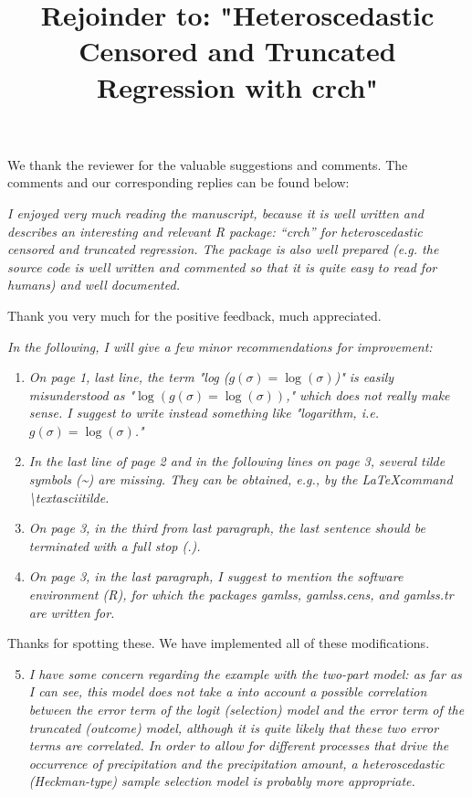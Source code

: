 \documentclass[12pt,a4paper]{article}
\begin{document}
\title{Rejoinder to: "Heteroscedastic Censored and Truncated Regression with crch"}
\maketitle

We thank the reviewer for the valuable suggestions and comments. The comments
and our corresponding replies can be found below:

\textit{I enjoyed very much reading the manuscript, because it is well written
and describes an interesting and relevant R package: ``crch'' for
heteroscedastic censored and truncated regression. The package is also well
prepared (e.g. the source code is well written and commented so that it is
quite easy to read for humans) and well documented.}

Thank you very much for the positive feedback, much appreciated.

\medskip

\textit{In the following, I will give a few minor recommendations for improvement:}
\begin{enumerate}
  \item \textit{On page 1, last line, the term "log ($g(\sigma) =
  \log(\sigma)$)" is easily misunderstood as "$\log(g(\sigma) =
  \log(\sigma))$," which does not really make sense.  I suggest to write
  instead something like "logarithm, i.e. $g(\sigma) = \log(\sigma)$."} 
  \item \textit{In the last line of page 2 and in the following lines on page
  3, several tilde symbols (\textasciitilde) are missing. They can be obtained,
  e.g., by the \LaTeX command \textbackslash textasciitilde.} 
  \item \textit{On
  page 3, in the third from last paragraph, the last sentence should be
  terminated with a full stop (.).} 
  \item \textit{On page 3, in the last paragraph, I suggest to mention the
  software environment (R), for which the packages gamlss, gamlss.cens, and
  gamlss.tr are written for.}
\end{enumerate}

Thanks for spotting these. We have implemented all of these modifications.

\medskip

\begin{enumerate}
  \setcounter{enumi}{4}
  \item \textit{I have some concern regarding the example with the two-part
  model: as far as I can see, this model does not take a into account a
  possible correlation between the error term of the logit (selection) model
  and the error term of the truncated (outcome) model, although it is quite
  likely that these two error terms are correlated. In order to allow for
  different processes that drive the occurrence of precipitation and the
  precipitation amount, a heteroscedastic (Heckman-type) sample selection model
  is probably more appropriate.}
\end{enumerate}
\end{document}
